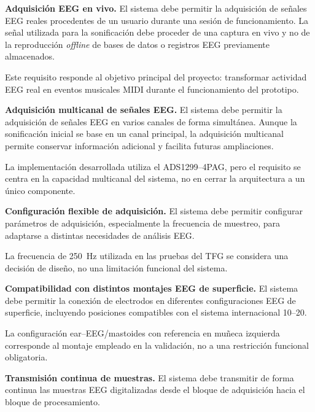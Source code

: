 \documentclass[../main.tex]{subfiles}
\begin{document}
\begin{description}[leftmargin=!,labelwidth=1.8cm]

    \item[RF-1] \textbf{Adquisición EEG en vivo.} El sistema debe permitir la adquisición de señales EEG reales procedentes de un usuario durante una sesión de funcionamiento. La señal utilizada para la sonificación debe proceder de una captura en vivo y no de la reproducción \textit{offline} de bases de datos o registros EEG previamente almacenados.

    Este requisito responde al objetivo principal del proyecto: transformar actividad EEG real en eventos musicales MIDI durante el funcionamiento del prototipo.

    \item[RF-2] \textbf{Adquisición multicanal de señales EEG.} El sistema debe permitir la adquisición de señales EEG en varios canales de forma simultánea. Aunque la sonificación inicial se base en un canal principal, la adquisición multicanal permite conservar información adicional y facilita futuras ampliaciones.

    La implementación desarrollada utiliza el ADS1299--4PAG, pero el requisito se centra en la capacidad multicanal del sistema, no en cerrar la arquitectura a un único componente.

    \item[RF-3] \textbf{Configuración flexible de adquisición.} El sistema debe permitir configurar parámetros de adquisición, especialmente la frecuencia de muestreo, para adaptarse a distintas necesidades de análisis EEG.

    La frecuencia de \SI{250}{\hertz} utilizada en las pruebas del TFG se considera una decisión de diseño, no una limitación funcional del sistema.

    \item[RF-4] \textbf{Compatibilidad con distintos montajes EEG de superficie.} El sistema debe permitir la conexión de electrodos en diferentes configuraciones EEG de superficie, incluyendo posiciones compatibles con el sistema internacional 10--20.

    La configuración ear--EEG/mastoides con referencia en muñeca izquierda corresponde al montaje empleado en la validación, no a una restricción funcional obligatoria.

    \item[RF-5] \textbf{Transmisión continua de muestras.} El sistema debe transmitir de forma continua las muestras EEG digitalizadas desde el bloque de adquisición hacia el bloque de procesamiento.


\end{description}
\end{document}
